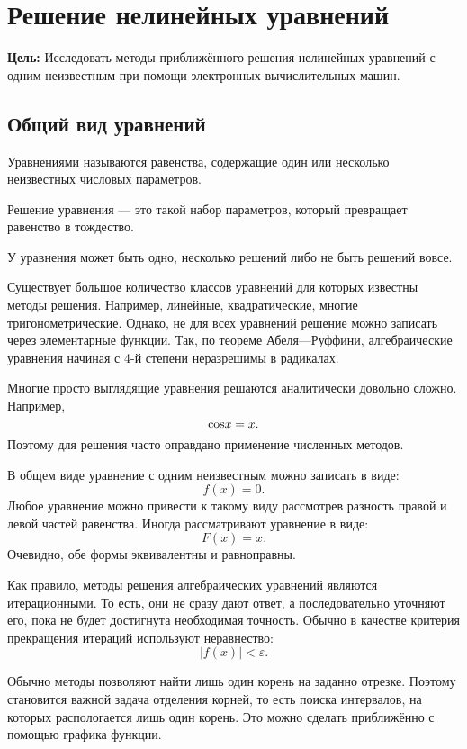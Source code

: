 \section{Решение нелинейных уравнений}

\noindent \textbf{Цель:} Исследовать методы приближённого решения
нелинейных уравнений с одним неизвестным при помощи электронных вычислительных
машин.

\medskip{}



\subsection{Общий вид уравнений}
\begin{defn}
Уравнениями называются равенства, содержащие один или несколько неизвестных
числовых параметров.
\end{defn}

\begin{defn}
Решение уравнения — это такой набор параметров, который превращает
равенство в тождество.
\end{defn}
У уравнения может быть одно, несколько решений либо не быть решений
вовсе.

Существует большое количество классов уравнений для которых известны
методы решения. Например, линейные, квадратические, многие тригонометрические.
Однако, не для всех уравнений решение можно записать через элементарные
функции. Так, по теореме Абеля—Руффини, алгебраические уравнения начиная
с 4-й степени неразрешимы в радикалах.

Многие просто выглядящие уравнения решаются аналитически довольно
сложно. Например,
\[
\text{\ensuremath{\cos}}x=x.
\]
Поэтому для решения часто оправдано применение численных методов.

В общем виде уравнение с одним неизвестным можно записать в виде:
\[
f(x)=0.
\]
Любое уравнение можно привести к такому виду рассмотрев разность правой
и левой частей равенства. Иногда рассматривают уравнение в виде:
\[
F(x)=x.
\]
Очевидно, обе формы эквивалентны и равноправны.

Как правило, методы решения алгебраических уравнений являются итерационными.
То есть, они не сразу дают ответ, а последовательно уточняют его,
пока не будет достигнута необходимая точность. Обычно в качестве критерия
прекращения итераций используют неравнество:
\[
|f(x)|<\varepsilon.
\]


Обычно методы позволяют найти лишь один корень на заданно отрезке.
Поэтому становится важной задача отделения корней, то есть поиска
интервалов, на которых распологается лишь один корень. Это можно сделать
приближённо с помощью графика функции.



